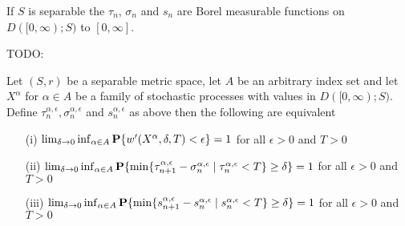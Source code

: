 \begin{clm}If $S$ is separable the $\tau_n$, $\sigma_n$ and $s_n$ are Borel measurable functions on $D([0,\infty); S)$ to $[0,\infty]$.
\end{clm}
TODO:

\begin{lem}\label{SkorohodInfiniteModulusOfContinuityEquivalences}Let $(S,r)$ be a separable metric space, let $A$ be an arbitrary index set and let $X^\alpha$ for $\alpha \in A$ be a family of stochastic processes with values in $D([0,\infty); S)$.  Define $\tau^{\alpha, \epsilon}_n, \sigma^{\alpha, \epsilon}_n$ and $s^{\alpha, \epsilon}_n$ as above then the following are equivalent
\begin{itemize}
\item[(i)]$\lim_{\delta \to 0} \inf_{\alpha \in A} \textbf{P}\{w^{\prime}(X^\alpha, \delta, T) < \epsilon\} = 1$ for all $\epsilon > 0$ and $T > 0$
\item[(ii)]$\lim_{\delta \to 0} \inf_{\alpha \in A} \textbf{P}\{\min \lbrace \tau^{\alpha, \epsilon}_{n+1} - \sigma^{\alpha, \epsilon}_n \mid \tau^{\alpha, \epsilon}_n < T \rbrace \geq \delta\} = 1$ for all 
$\epsilon > 0$ and $T > 0$
\item[(iii)]$\lim_{\delta \to 0} \inf_{\alpha \in A} \textbf{P}\{\min \lbrace s^{\alpha, \epsilon}_{n+1} - s^{\alpha, \epsilon}_n \mid s^{\alpha, \epsilon}_n < T \rbrace \geq \delta\} = 1$ for all 
$\epsilon > 0$ and $T > 0$
\end{itemize}
\end{lem}
